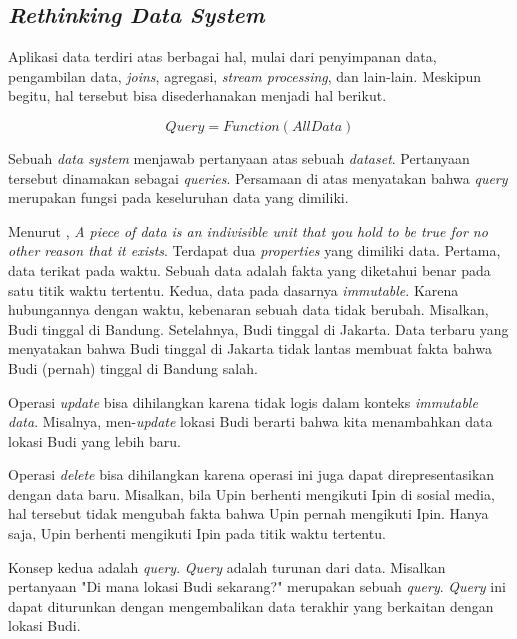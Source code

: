 \subsection{\textit{Rethinking Data System}}

Aplikasi data terdiri atas berbagai hal, mulai dari penyimpanan data, pengambilan data, \textit{joins}, agregasi, \textit{stream processing}, dan lain-lain. Meskipun begitu, hal tersebut bisa disederhanakan menjadi hal berikut.

\[Query = Function(All Data)\]

Sebuah \textit{data system} menjawab pertanyaan atas sebuah \textit{dataset}. Pertanyaan tersebut dinamakan sebagai \textit{queries}. Persamaan di atas menyatakan bahwa \textit{query} merupakan fungsi pada keseluruhan data yang dimiliki.

Menurut \cite{howToBeatCAP}, \textit{A piece of data is an indivisible unit that you hold to be true for no other reason that it exists}. Terdapat dua \textit{properties} yang dimiliki data. Pertama, data terikat pada waktu. Sebuah data adalah fakta yang diketahui benar pada satu titik waktu tertentu. Kedua, data pada dasarnya \textit{immutable}. Karena hubungannya dengan waktu, kebenaran sebuah data tidak berubah. Misalkan, Budi tinggal di Bandung. Setelahnya, Budi tinggal di Jakarta. Data terbaru yang menyatakan bahwa Budi tinggal di Jakarta tidak lantas membuat fakta bahwa Budi (pernah) tinggal di Bandung salah.

Operasi \textit{update} bisa dihilangkan karena tidak logis dalam konteks \textit{immutable data}. Misalnya, men-\textit{update} lokasi Budi berarti bahwa kita menambahkan data lokasi Budi yang lebih baru.

Operasi \textit{delete} bisa dihilangkan karena operasi ini juga dapat direpresentasikan dengan data baru. Misalkan, bila Upin berhenti mengikuti Ipin di sosial media, hal tersebut tidak mengubah fakta bahwa Upin pernah mengikuti Ipin. Hanya saja, Upin berhenti mengikuti Ipin pada titik waktu tertentu.

Konsep kedua adalah \textit{query}. \textit{Query} adalah turunan dari data. Misalkan pertanyaan "Di mana lokasi Budi sekarang?" merupakan sebuah \textit{query}. \textit{Query} ini dapat diturunkan dengan mengembalikan data terakhir yang berkaitan dengan lokasi Budi.